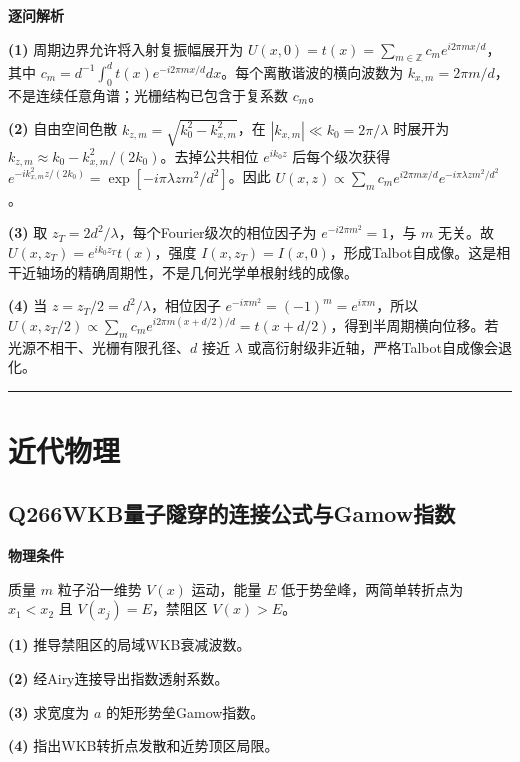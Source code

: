 \documentclass[UTF8,a4paper,11pt,oneside,openany]{ctexbook}
\begin{document}
\par\medskip\noindent\textbf{逐问解析}
\par\noindent\textbf{(1)} 周期边界允许将入射复振幅展开为 \(U(x,0)=t(x)=\sum_{m\in\mathbb Z}c_me^{i2\pi mx/d}\)，其中 \(c_m=d^{-1}\int_0^dt(x)e^{-i2\pi mx/d}dx\)。每个离散谐波的横向波数为 \(k_{x,m}=2\pi m/d\)，不是连续任意角谱；光栅结构已包含于复系数 \(c_m\)。
\par\noindent\textbf{(2)} 自由空间色散 \(k_{z,m}=\sqrt{k_0^2-k_{x,m}^2}\)，在 \(|k_{x,m}|\ll k_0=2\pi/\lambda\) 时展开为 \(k_{z,m}\approx k_0-k_{x,m}^2/(2k_0)\)。去掉公共相位 \(e^{ik_0z}\) 后每个级次获得 \(e^{-ik_{x,m}^2z/(2k_0)}=\exp[-i\pi\lambda z m^2/d^2]\)。因此 \(U(x,z)\propto\sum_m c_me^{i2\pi mx/d}e^{-i\pi\lambda zm^2/d^2}\)。
\par\noindent\textbf{(3)} 取 \(z_T=2d^2/\lambda\)，每个Fourier级次的相位因子为 \(e^{-i2\pi m^2}=1\)，与 \(m\) 无关。故 \(U(x,z_T)=e^{ik_0z_T}t(x)\)，强度 \(I(x,z_T)=I(x,0)\)，形成Talbot自成像。这是相干近轴场的精确周期性，不是几何光学单根射线的成像。
\par\noindent\textbf{(4)} 当 \(z=z_T/2=d^2/\lambda\)，相位因子 \(e^{-i\pi m^2}=(-1)^m=e^{i\pi m}\)，所以 \(U(x,z_T/2)\propto\sum_m c_me^{i2\pi m(x+d/2)/d}=t(x+d/2)\)，得到半周期横向位移。若光源不相干、光栅有限孔径、\(d\) 接近 \(\lambda\) 或高衍射级非近轴，严格Talbot自成像会退化。

\par\bigskip\hrule\bigskip
\chapter{近代物理}
\section*{Q266\quad WKB量子隧穿的连接公式与Gamow指数}
\textbf{物理条件}\par 质量 \(m\) 粒子沿一维势 \(V(x)\) 运动，能量 \(E\) 低于势垒峰，两简单转折点为 \(x_1<x_2\) 且 \(V(x_j)=E\)，禁阻区 \(V(x)>E\)。
\par\noindent\textbf{(1)} 推导禁阻区的局域WKB衰减波数。
\par\noindent\textbf{(2)} 经Airy连接导出指数透射系数。
\par\noindent\textbf{(3)} 求宽度为 \(a\) 的矩形势垒Gamow指数。
\par\noindent\textbf{(4)} 指出WKB转折点发散和近势顶区局限。
\end{document}
